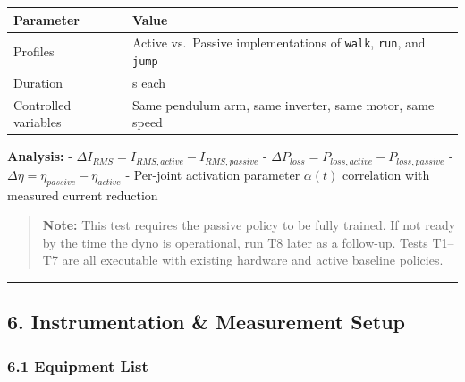 \documentclass[
]{article}
\newcounter{none} %
\begin{document}
{\def\LTcaptype{none} %
\begin{longtable}[]{@{}
  >{\raggedright\arraybackslash}p{}
  >{\raggedright\arraybackslash}p{}@{}}
\toprule\noalign{}
\begin{minipage}[b]{\linewidth}\raggedright
Parameter
\end{minipage} & \begin{minipage}[b]{\linewidth}\raggedright
Value
\end{minipage} \\
\midrule\noalign{}
\endhead
\bottomrule\noalign{}
\endlastfoot
Profiles & Active vs.~Passive implementations of \texttt{walk},
\texttt{run}, and \texttt{jump} \\
Duration & 60 s each \\
Controlled variables & Same pendulum arm, same inverter, same motor,
same speed \\
\end{longtable}
}

\textbf{Analysis:} -
\(\Delta I_{RMS} = I_{RMS,active} - I_{RMS,passive}\) -
\(\Delta P_{loss} = P_{loss,active} - P_{loss,passive}\) -
\(\Delta \eta = \eta_{passive} - \eta_{active}\) - Per-joint activation
parameter \(\alpha(t)\) correlation with measured current reduction

\begin{quote}
\textbf{Note:} This test requires the passive policy to be fully
trained. If not ready by the time the dyno is operational, run T8 later
as a follow-up. Tests T1--T7 are all executable with existing hardware
and active baseline policies.
\end{quote}

\begin{center}\rule{0.5\linewidth}{0.5pt}\end{center}

\subsection{6. Instrumentation \& Measurement
Setup}\label{instrumentation-measurement-setup}

\subsubsection{6.1 Equipment List}\label{equipment-list}
\end{document}
